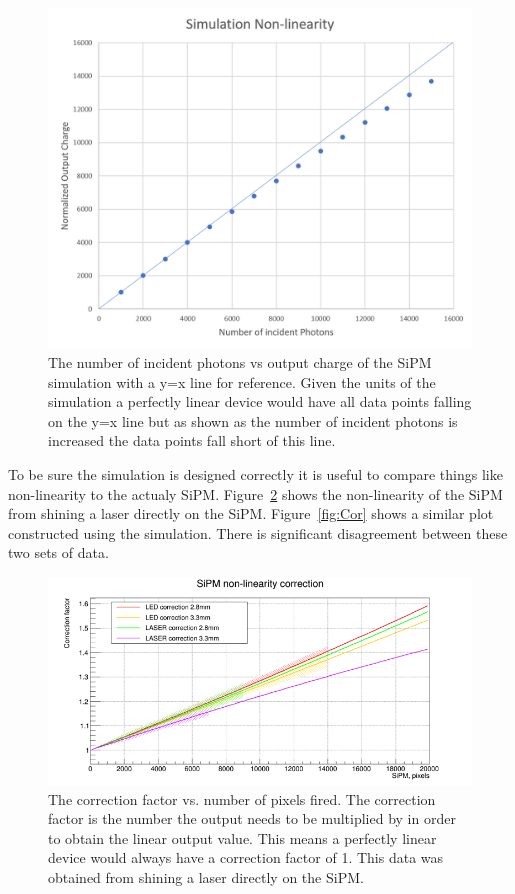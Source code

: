 \begin{figure}
\centering
\includegraphics[width=0.8\linewidth]{Figures/SimNon.png}
\caption{The number of incident photons vs output charge of the SiPM simulation with a y=x line for reference. Given the units of the simulation a perfectly linear device would have all data points falling on the y=x line but as shown as the number of incident photons is increased the data points fall short of this line.}
\label{fig:SimNon}
\end{figure}

To be sure the simulation is designed correctly it is useful to compare things like non-linearity to the actualy SiPM. Figure~\ref{fig:NonLin} shows the non-linearity of the SiPM from shining a laser directly on the SiPM. Figure~\ref{fig:Cor} shows a similar plot constructed using the simulation. There is significant disagreement between these two sets of data.

\begin{figure}
\centering
\includegraphics[width=\linewidth]{Figures/LaserNonLin.png}
\caption{The correction factor vs. number of pixels fired. The correction factor is the number the output needs to be multiplied by in order to obtain the linear output value. This means a perfectly linear device would always have a correction factor of 1. This data was obtained from shining a laser directly on the SiPM.}
\label{fig:NonLin}
\end{figure}

